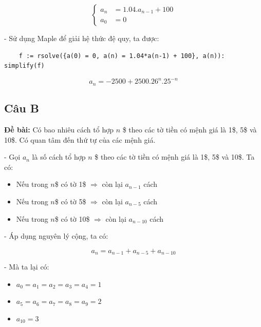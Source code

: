 \documentclass[12pt]{article}
\begin{document}
\begin{sloppypar}
\[
    \begin{cases}
        a_{n} & = 1.04.a_{n-1} + 100 \\             
        a_{0} & = 0
    \end{cases} 
    \]

- Sử dụng Maple để giải hệ thức đệ quy, ta được:

\begin{verbatim}
    f := rsolve({a(0) = 0, a(n) = 1.04*a(n-1) + 100}, a(n)): simplify(f)
\end{verbatim}

\begin{equation*}
    a_{n} = -2500 + 2500.26^{n}.25^{-n}
\end{equation*}

\subsection{Câu B}
\begin{tcolorbox}
    \textbf{Đề bài:} Có bao nhiêu cách tổ hợp \(n\) \$ theo các tờ tiền có mệnh giá là 1\$, 5\$ và 10\$. Có quan tâm đến thứ tự của các mệnh giá.
\end{tcolorbox}

- Gọi \(a_{n}\) là số cách tổ hợp \(n\) \$ theo các tờ tiền có mệnh giá là 1\$, 5\$ và 10\$. Ta có:

\begin{itemize}
    \item Nếu trong \(n\)\$ có tờ 1\$ \(\Rightarrow\) còn lại \(a_{n-1}\) cách
    \item Nếu trong \(n\)\$ có tờ 5\$ \(\Rightarrow\) còn lại \(a_{n-5}\) cách
    \item Nếu trong \(n\)\$ có tờ 10\$ \(\Rightarrow\) còn lại \(a_{n-10}\) cách
\end{itemize}

- Áp dụng nguyên lý cộng, ta có:

\begin{equation*}
    a_{n} = a_{n-1} + a_{n-5} + a_{n-10}
\end{equation*}

- Mà ta lại có:

\begin{itemize}
    \item \(a_{0} = a_{1} = a_{2} = a_{3} = a_{4} = 1\)
    \item \(a_{5} = a_{6} = a_{7} = a_{8} = a_{9} = 2\)
    \item \(a_{10} = 3\)
\end{itemize}


\end{sloppypar}
\end{document}
